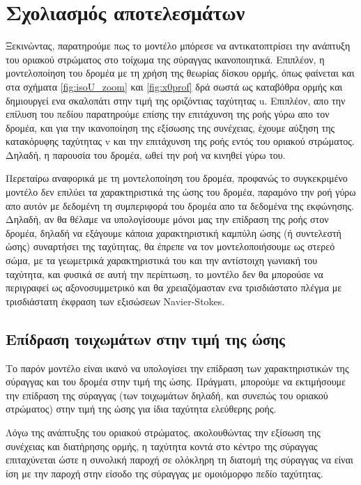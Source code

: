 \section{Σχολιασμός αποτελεσμάτων}

Ξεκινώντας, παρατηρούμε πως το μοντέλο μπόρεσε να αντικατοπτρίσει την ανάπτυξη του οριακού στρώματος στο τοίχωμα της σύραγγας ικανοποιητικά. Επιπλέον, η μοντελοποίηση του δρομέα με τη χρήση της θεωρίας δίσκου ορμής, όπως φαίνεται και στα σχήματα \ref{fig:isoU_zoom} και \ref{fig:x0prof} δρά σωστά ως καταβόθρα ορμής και δημιουργεί ενα σκαλοπάτι στην τιμή της οριζόντιας ταχύτητας u. Επιπλέον, απο την επίλυση του πεδίου παρατηρούμε επίσης την επιτάχυνση της ροής γύρω απο τον δρομέα, και για την ικανοποίηση της εξίσωσης της συνέχειας, έχουμε αύξηση της κατακόρυφης ταχύτητας v και την επιτάχυνση της ροής εντός του οριακού στρώματος. Δηλαδή, η παρουσία του δρομέα, ωθεί την ροή να κινηθεί γύρω του.

Περεταίρω αναφορικά με τη μοντελοποίηση του δρομέα, προφανώς το συγκεκριμένο μοντέλο δεν επιλύει τα χαρακτηριστικά της ώσης του δρομέα, παραμόνο την ροή γύρω απο αυτόν με δεδομένη τη συμπεριφορά του δρομέα απο τα δεδομένα της εκφώνησης. Δηλαδή, αν θα θέλαμε να υπολογίσουμε μόνοι μας την επίδραση της ροής στον δρομέα, δηλαδή να εξάγουμε κάποια χαρακτηριστική καμπύλη ώσης (ή συντελεστή ώσης) συναρτήσει της ταχύτητας, θα έπρεπε να τον μοντελοποιήσουμε ως στερεό σώμα, με τα γεωμετρικά χαρακτηριστικά του και την αντίστοιχη γωνιακή του ταχύτητα, και φυσικά σε αυτή την περίπτωση, το μοντέλο δεν θα μπορούσε να περιγραφεί ως αξονοσυμμετρικό και θα χρειαζόμασταν ενα τρισδιάστατο πλέγμα με τρισδιάστατη έκφραση των εξισώσεων Navier-Stokes. 

\subsection{Επίδραση τοιχωμάτων στην τιμή της ώσης}
Το παρόν μοντέλο είναι ικανό να υπολογίσει την επίδραση των χαρακτηριστικών της σύραγγας και του δρομέα στην τιμή της ώσης. Πράγματι, μπορούμε να εκτιμήσουμε την επίδραση της σύραγγας (των τοιχωμάτων δηλαδή, και συνεπώς του οριακού στρώματος) στην τιμή της ώσης για ίδια ταχύτητα ελεύθερης ροής.

Λόγω της ανάπτυξης του οριακού στρώματος, ακολουθώντας την εξίσωση της συνέχειας και διατήρησης ορμής, η ταχύτητα κοντά στο κέντρο της σύραγγας επιταχύνεται ώστε η συνολική παροχή σε ολόκληρη τη διατομή της σύραγγας να είναι ίση με την παροχή στην είσοδο της σύραγγας με ομοιόμορφο πεδίο ταχύτητας. 

